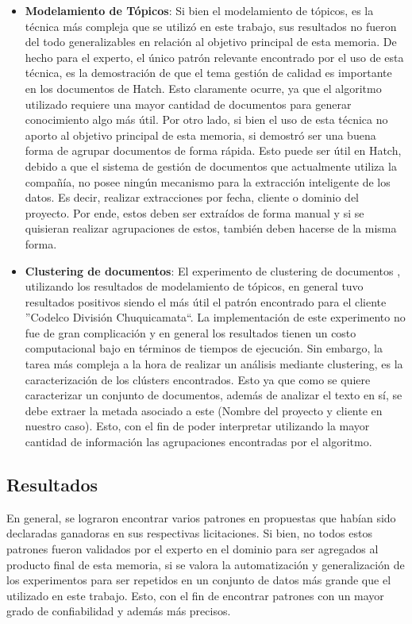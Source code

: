 \begin{itemize}
        \item \textbf{Modelamiento de Tópicos}: Si bien el modelamiento de tópicos, es la técnica más compleja que se utilizó en este trabajo, sus resultados no fueron del todo generalizables en relación al objetivo principal de esta memoria. De hecho para el experto, el único patrón relevante encontrado por el uso de esta técnica, es la demostración de que el tema gestión de calidad es importante en los documentos de Hatch. Esto claramente ocurre, ya que el algoritmo utilizado requiere una mayor cantidad de documentos para generar conocimiento algo más útil. Por otro lado, si bien el uso de esta técnica no aporto al objetivo principal de esta memoria, si demostró ser una buena forma de agrupar documentos de forma rápida. Esto puede ser útil en Hatch, debido a que el sistema de gestión de documentos que actualmente utiliza la compañía, no posee ningún mecanismo para la extracción inteligente de los datos. Es decir, realizar extracciones por fecha, cliente o dominio del proyecto. Por ende, estos deben ser extraídos de forma manual y si se quisieran realizar agrupaciones de estos, también deben hacerse de la misma forma.
        \item \textbf{Clustering de documentos}: El experimento de clustering de documentos , utilizando los resultados de modelamiento de tópicos, en general tuvo resultados positivos siendo el más útil el patrón encontrado para el cliente ''Codelco División Chuquicamata``. La implementación de este experimento no fue de gran complicación y en general los resultados tienen un costo computacional bajo en términos de tiempos de ejecución. Sin embargo, la tarea más compleja a la hora de realizar un análisis mediante clustering, es la caracterización de los clústers encontrados. Esto ya que como se quiere caracterizar un conjunto de documentos, además de analizar el texto en sí, se debe extraer la metada asociado a este (Nombre del proyecto y cliente en nuestro caso). Esto, con el fin de poder interpretar utilizando la mayor cantidad de información las agrupaciones encontradas por el algoritmo.
    \end{itemize}

\subsection{Resultados}
    En general, se lograron encontrar varios patrones en propuestas que habían sido declaradas ganadoras en sus respectivas licitaciones. Si bien, no todos estos patrones fueron validados por el experto en el dominio para ser agregados al producto final de esta memoria, si se valora la automatización y generalización de los experimentos para ser repetidos en un conjunto de datos más grande que el utilizado en este trabajo. Esto, con el fin de encontrar patrones con un mayor grado de confiabilidad y además más precisos.
    
